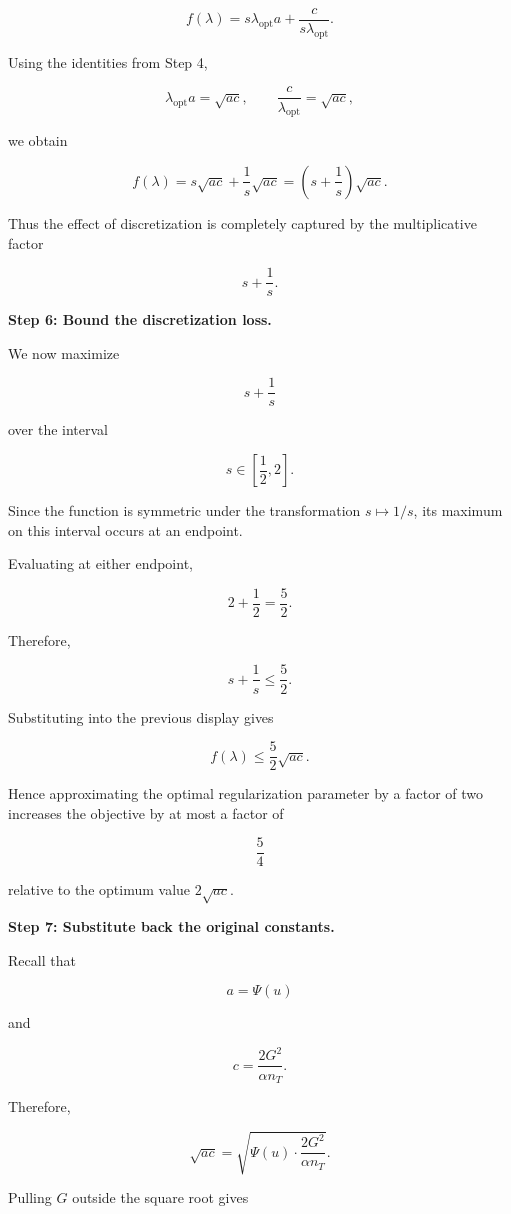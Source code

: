 \documentclass[11pt]{article}
\begin{document}
\begin{enumerate}
\begin{solutionbox}
\[
f(\lambda)
=
s\lambda_{\mathrm{opt}}a
+
\frac{c}
{s\lambda_{\mathrm{opt}}}.
\]

Using the identities from Step 4,

\[
\lambda_{\mathrm{opt}}a
=
\sqrt{ac},
\qquad
\frac{c}{\lambda_{\mathrm{opt}}}
=
\sqrt{ac},
\]

we obtain

\[
f(\lambda)
=
s\sqrt{ac}
+
\frac1s\sqrt{ac}
=
\left(
s+\frac1s
\right)\sqrt{ac}.
\]

Thus the effect of discretization is completely captured by the multiplicative factor

\[
s+\frac1s.
\]

\medskip

\textbf{Step 6: Bound the discretization loss.}

We now maximize

\[
s+\frac1s
\]

over the interval

\[
s\in\left[\frac12,2\right].
\]

Since the function is symmetric under the transformation $s\mapsto 1/s$, its maximum on this interval occurs at an endpoint.

Evaluating at either endpoint,

\[
2+\frac12
=
\frac52.
\]

Therefore,

\[
s+\frac1s
\le
\frac52.
\]

Substituting into the previous display gives

\[
f(\lambda)
\le
\frac52\sqrt{ac}.
\]

Hence approximating the optimal regularization parameter by a factor of two increases the objective by at most a factor of

\[
\frac54
\]

relative to the optimum value $2\sqrt{ac}$.

\medskip

\textbf{Step 7: Substitute back the original constants.}

Recall that

\[
a=\Psi(u)
\]

and

\[
c
=
\frac{2G^2}{\alpha n_T}.
\]

Therefore,

\[
\sqrt{ac}
=
\sqrt{
\Psi(u)
\cdot
\frac{2G^2}{\alpha n_T}
}.
\]

Pulling $G$ outside the square root gives


\end{solutionbox}
\end{enumerate}
\end{document}
